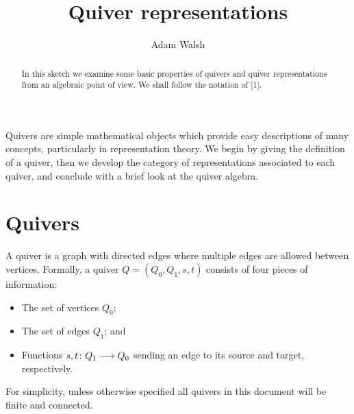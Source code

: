 \documentclass[a4paper]{amsart}
\title{Quiver representations}
\author{Adam Walsh}
\begin{document}
\maketitle
\begin{abstract}
    In this sketch we examine some basic properties of quivers and quiver representations from an algebraic point of view. We shall follow the notation of [1].
\end{abstract}
Quivers are simple mathematical objects which provide easy descriptions of many concepts, particularly in representation theory. We begin by giving the definition of a quiver, then we develop the category of representations associated to each quiver, and conclude with a brief look at the quiver algebra.
\section*{Quivers}
\begin{Definition}
    A quiver is a graph with directed edges where multiple edges are allowed between vertices. Formally, a quiver $Q=(Q_0,Q_1,s,t)$ consists of four pieces of information:
    \begin{itemize}
        \item The set of vertices $Q_0$;
        \item The set of edges $Q_1$; and
        \item Functions $s,t\colon Q_1\longrightarrow Q_0$ sending an edge to its source and target, respectively.
    \end{itemize}
\end{Definition}
For simplicity, unless otherwise specified all quivers in this document will be finite and connected.
\end{document}
